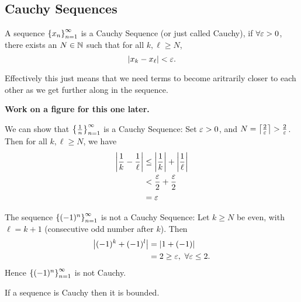 \documentclass[12pt]{article}
\theoremstyle{definition}
\newcommand{\xn}{\set{x_{n}}_{n = 1}^{\infty}}
\begin{document}
    \subsection{Cauchy Sequences}
    \begin{definition}
        A sequence $\xn$ is a Cauchy Sequence (or just called Cauchy), if $\forall \varepsilon > 0$, there exists an $N \in \mathbb{N}$ such that for all $k, \ell \geq N$,
        \begin{equation*}
            \left|x_{k} - x_{\ell}\right| < \varepsilon.
        \end{equation*} 
    \end{definition}
    \begin{remark}
        Effectively this just means that we need terms to become aritrarily closer to each other as we get further along in the sequence.
    \end{remark}
    \textbf{Work on a figure for this one later.}
    \begin{eg}
        We can show that $\left\{\frac{1}{n}\right\}_{n = 1}^{\infty}$ is a Cauchy Sequence: 
        Set $\varepsilon > 0$, and $N = \left\lceil\frac{2}{\varepsilon}\right\rceil > \frac{2}{\varepsilon}$. Then for all $k, \ell \geq N$, we have
        \begin{align*}
            \left|\frac{1}{k} - \frac{1}{\ell}\right| &\leq \left|\frac{1}{k}\right| + \left|\frac{1}{\ell}\right| \\
                                               &< \frac{\varepsilon}{2} + \frac{\varepsilon}{2} \\
                                               &= \varepsilon
        \end{align*}
    \end{eg}
    \begin{eg}
        The sequence $\left\{(-1)^{n}\right\}_{n = 1}^{\infty}$ is not a Cauchy Sequence:
        Let $k \geq N$ be even, with $\ell = k + 1$ (consecutive odd number after $k$). Then
        \begin{align*}
            \left|(-1)^{k} + (-1)^{l}\right| &= \left|1 + (-1)\right| \\
                                      &= 2 \geq \varepsilon, ~ \forall \varepsilon \leq 2.
        \end{align*}
        Hence $\left\{(-1)^{n}\right\}_{n = 1}^{\infty}$ is not Cauchy.
    \end{eg}
    \newpage
    \begin{prop}
        If a sequence is Cauchy then it is bounded.
    \end{prop}
\end{document}
